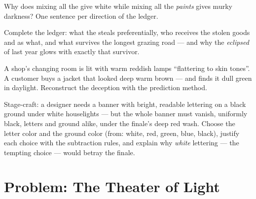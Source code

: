 \begin{exercise}[$\star\star$]\label{exo:g8:colors-spectra:9}
Why does mixing all the \emph{} give white while mixing
all the \emph{paints} gives murky darkness? One sentence per
direction of the ledger.
\end{exercise}

\begin{exercise}[$\star\star$]\label{exo:g8:colors-spectra:10}
Complete the  ledger: what the  steals preferentially,
who receives the stolen goods and as what, and what survives
the longest grazing road --- and why the \emph{eclipsed }
of last year glows with exactly that survivor.
\end{exercise}

\begin{exercise}[$\star\star$]\label{exo:g8:colors-spectra:11}
A shop's changing room is lit with warm reddish lamps
``flattering to skin tones''. A customer buys a jacket that
looked deep warm brown --- and finds it dull green in
daylight. Reconstruct the deception with the prediction
method.
\end{exercise}

\begin{exercise}[$\star\star\star$]\label{exo:g8:colors-spectra:12}
Stage-craft: a designer needs a banner with bright, readable
lettering on a black ground under white houselights --- but the
whole banner must vanish, uniformly black, letters and ground
alike, under the finale's deep red wash. Choose the letter
color and the ground color (from: white, red, green, blue,
black), justify each choice with the subtraction rules, and
explain why \emph{white} lettering --- the tempting choice ---
would betray the finale.
\end{exercise}

\section{Problem: The Theater of Light}

